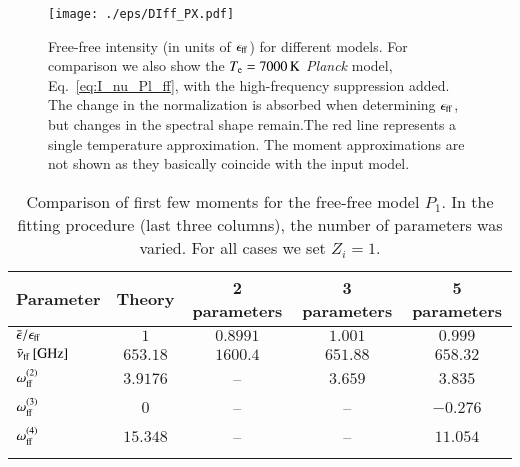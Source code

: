 \documentclass[usenatbib]{mn2e}
\begin{document}
\begin{figure}
\centering 
\texttt{[image: ./eps/DIff\_PX.pdf]}
\caption{Free-free intensity (in units of $\epsilon_{\rm ff}$) for different models. For comparison we also show the $T_{\rm e}=7000\,{\rm K}$ {\it Planck} model, Eq.~\eqref{eq:I_nu_Pl_ff}, with the high-frequency suppression added. The change in the normalization is absorbed when determining $\epsilon_{\rm ff}$, but changes in the spectral shape remain.The red line represents a single temperature approximation. The moment approximations are not shown as they basically coincide with the input model.}
\label{fig:ff_PX}
\end{figure}

\begin{table}
\centering
\caption{Comparison of first few moments for the free-free model $P_1$. In the fitting procedure (last three columns), the number of parameters was varied. For all cases we set $Z_i=1$.}
\begin{tabular}{lcccc}
\hline
\hline
Parameter & Theory & 2 parameters & 3 parameters & 5 parameters
\\[1pt]
\hline
$\bar{\epsilon}/\epsilon_{\rm ff}$ & $1$ & $0.8991$ & $1.001$ & $0.999$
\\[1pt]
$\bar{\nu}_{\rm ff}\, [{\rm GHz}]$ & $653.18$ & $1600.4$ & $651.88$ & $658.32$
\\[1pt]
$\omega_{\rm ff}^{(2)}$ & $3.9176$ & -- & $3.659$ & $3.835$
\\[1pt]
$\omega_{\rm ff}^{(3)}$ & $0$ & -- & -- & $-0.276$
\\[1pt]
$\omega_{\rm ff}^{(4)}$ & $15.348$ & -- & -- & $11.054$
\\[1pt]
\hline
\hline
\label{tab:two}
\end{tabular}
\end{table}
\end{document}
